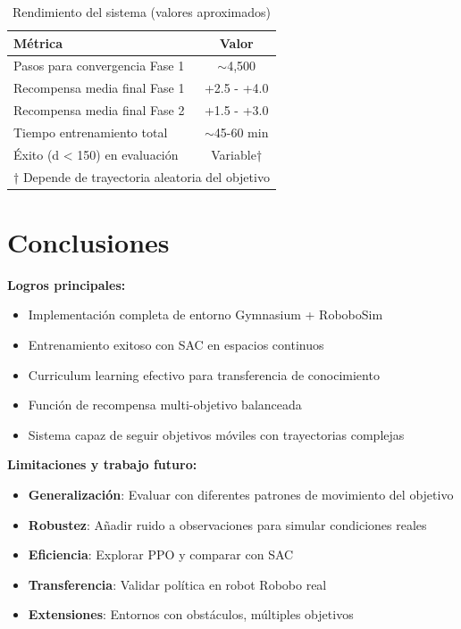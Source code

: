\documentclass[12pt,a4paper]{article}
\begin{document}
\begin{table}[H]
\centering
\begin{tabular}{@{}lc@{}}
\toprule
\textbf{Métrica} & \textbf{Valor} \\ \midrule
Pasos para convergencia Fase 1 & $\sim$4,500 \\
Recompensa media final Fase 1 & +2.5 - +4.0 \\
Recompensa media final Fase 2 & +1.5 - +3.0 \\
Tiempo entrenamiento total & $\sim$45-60 min \\
Éxito (d < 150) en evaluación & Variable† \\ \bottomrule
\multicolumn{2}{l}{\footnotesize † Depende de trayectoria aleatoria del objetivo}
\end{tabular}
\caption{Rendimiento del sistema (valores aproximados)}
\end{table}

\section{Conclusiones}

\textbf{Logros principales:}
\begin{itemize}
    \item Implementación completa de entorno Gymnasium + RoboboSim
    \item Entrenamiento exitoso con SAC en espacios continuos
    \item Curriculum learning efectivo para transferencia de conocimiento
    \item Función de recompensa multi-objetivo balanceada
    \item Sistema capaz de seguir objetivos móviles con trayectorias complejas
\end{itemize}

\textbf{Limitaciones y trabajo futuro:}
\begin{itemize}
    \item \textbf{Generalización}: Evaluar con diferentes patrones de movimiento del objetivo
    \item \textbf{Robustez}: Añadir ruido a observaciones para simular condiciones reales
    \item \textbf{Eficiencia}: Explorar PPO y comparar con SAC
    \item \textbf{Transferencia}: Validar política en robot Robobo real
    \item \textbf{Extensiones}: Entornos con obstáculos, múltiples objetivos
\end{itemize}
\end{document}

